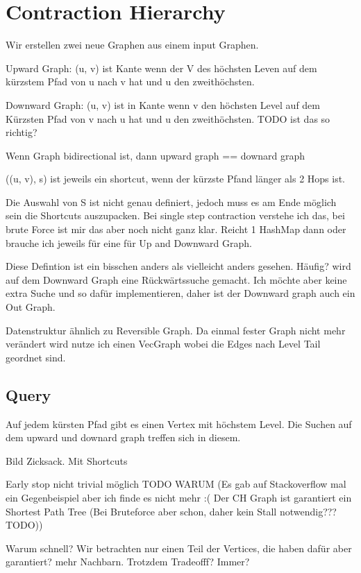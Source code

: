 \chapter{Contraction Hierarchy}

Wir erstellen zwei neue Graphen aus einem input Graphen.

Upward Graph: (u, v) ist Kante wenn der V des höchsten Leven auf dem kürzstem Pfad von u nach v hat und u den zweithöchsten.

Downward Graph: (u, v) ist in Kante wenn v den höchsten Level auf dem Kürzsten Pfad von v nach u hat und u den zweithöchsten.
TODO ist das so richtig?

Wenn Graph bidirectional ist, dann upward graph == downard graph

((u, v), s) ist jeweils ein shortcut, wenn der kürzste Pfand länger als 2 Hops ist.

Die Auswahl von S ist nicht genau definiert, jedoch muss es am Ende möglich sein die Shortcuts auszupacken.
Bei single step contraction verstehe ich das, bei brute Force ist mir das aber noch nicht ganz klar. Reicht 1 HashMap dann oder brauche ich jeweils für eine für Up and Downward Graph.


Diese Defintion ist ein bisschen anders als vielleicht anders gesehen. Häufig? wird auf dem Downward Graph eine Rückwärtssuche gemacht. Ich möchte aber keine extra Suche und so dafür implementieren, daher ist der Downward graph auch ein Out Graph.

Datenstruktur ähnlich zu Reversible Graph. Da einmal fester Graph nicht mehr verändert wird nutze ich einen VecGraph wobei die Edges nach Level Tail geordnet sind.

\section{Query}
Auf jedem kürsten Pfad gibt es einen Vertex mit höchstem Level. Die Suchen auf dem upward und downard graph treffen sich in diesem.

Bild Zicksack. Mit Shortcuts

Early stop nicht trivial möglich TODO WARUM (Es gab auf Stackoverflow mal ein Gegenbeispiel aber ich finde es nicht mehr :( Der CH Graph ist garantiert ein Shortest Path Tree (Bei Bruteforce aber schon, daher kein Stall notwendig??? TODO))

Warum schnell? Wir betrachten nur einen Teil der Vertices, die haben dafür aber garantiert? mehr Nachbarn. Trotzdem Tradeofff? Immer?

